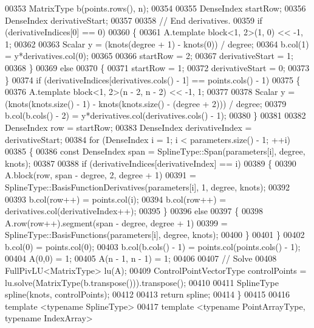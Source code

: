 \begin{DoxyCode}
00353     MatrixType b(points.rows(), n);
00354 
00355     DenseIndex startRow;
00356     DenseIndex derivativeStart;
00357 
00358     \textcolor{comment}{// End derivatives.}
00359     \textcolor{keywordflow}{if} (derivativeIndices[0] == 0)
00360     \{
00361       A.template block<1, 2>(1, 0) << -1, 1;
00362       
00363       Scalar y = (knots(degree + 1) - knots(0)) / degree;
00364       b.col(1) = y*derivatives.col(0);
00365       
00366       startRow = 2;
00367       derivativeStart = 1;
00368     \}
00369     \textcolor{keywordflow}{else}
00370     \{
00371       startRow = 1;
00372       derivativeStart = 0;
00373     \}
00374     \textcolor{keywordflow}{if} (derivativeIndices[derivatives.cols() - 1] == points.cols() - 1)
00375     \{
00376       A.template block<1, 2>(n - 2, n - 2) << -1, 1;
00377 
00378       Scalar y = (knots(knots.size() - 1) - knots(knots.size() - (degree + 2))) / degree;
00379       b.col(b.cols() - 2) = y*derivatives.col(derivatives.cols() - 1);
00380     \}
00381     
00382     DenseIndex row = startRow;
00383     DenseIndex derivativeIndex = derivativeStart;
00384     \textcolor{keywordflow}{for} (DenseIndex i = 1; i < parameters.size() - 1; ++i)
00385     \{
00386       \textcolor{keyword}{const} DenseIndex span = SplineType::Span(parameters[i], degree, knots);
00387 
00388       \textcolor{keywordflow}{if} (derivativeIndices[derivativeIndex] == i)
00389       \{
00390         A.block(row, span - degree, 2, degree + 1)
00391           = SplineType::BasisFunctionDerivatives(parameters[i], 1, degree, knots);
00392 
00393         b.col(row++) = points.col(i);
00394         b.col(row++) = derivatives.col(derivativeIndex++);
00395       \}
00396       \textcolor{keywordflow}{else}
00397       \{
00398         A.row(row++).segment(span - degree, degree + 1)
00399           = SplineType::BasisFunctions(parameters[i], degree, knots);
00400       \}
00401     \}
00402     b.col(0) = points.col(0);
00403     b.col(b.cols() - 1) = points.col(points.cols() - 1);
00404     A(0,0) = 1;
00405     A(n - 1, n - 1) = 1;
00406     
00407     \textcolor{comment}{// Solve}
00408     FullPivLU<MatrixType> lu(A);
00409     ControlPointVectorType controlPoints = lu.solve(MatrixType(b.transpose())).transpose();
00410 
00411     SplineType spline(knots, controlPoints);
00412     
00413     \textcolor{keywordflow}{return} spline;
00414   \}
00415   
00416   \textcolor{keyword}{template} <\textcolor{keyword}{typename} SplineType>
00417   \textcolor{keyword}{template} <\textcolor{keyword}{typename} Po\textcolor{keywordtype}{int}ArrayType, \textcolor{keyword}{typename} IndexArray>

\end{DoxyCode}
